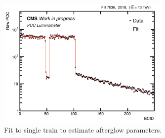 

\begin{figure}[H]
  \centering
    \includegraphics[width=0.75\textwidth]{ashish_thesis/2018_af_fit_1.png} 
  \caption[Afterglow Effect Fit]{Fit to single train to estimate afterglow parameters.}
  \label{fig:af_fit99}
\end{figure}



